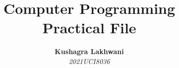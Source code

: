 \newcommand{\hmwkTitle}{Practical File} %
\newcommand{\hmwkClass}{Computer Programming} %
\newcommand{\hmwkDueDate}{Due\ Date} %

\date{}

\title{
    \vspace{2in}
    \textmd{\textbf{\hmwkClass}}\\
    \normalsize\vspace{0.1in}\small{\hmwkTitle}\\
    \vspace{3.in}
}

\newcommand{\hmwkAuthorNameOne}{Kushagra Lakhwani}
\newcommand{\hmwkAuthorNumberOne}{2021UCI8036}

\author{
    \textbf{\hmwkAuthorNameOne}\\
    \textit{\hmwkAuthorNumberOne}
}
